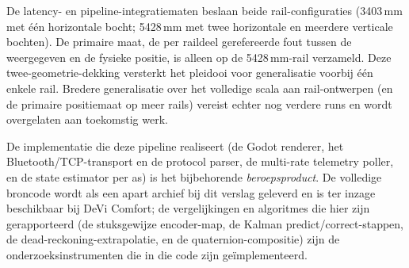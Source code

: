 \documentclass[10pt, a4paper, twocolumn]{article}
\begin{document}
De latency- en pipeline-integratiematen beslaan beide rail-configuraties
(3403\,mm met één horizontale bocht; 5428\,mm met twee horizontale en meerdere
verticale bochten). De primaire maat, de per raildeel gerefereerde fout tussen de weergegeven
en de fysieke positie, is alleen op de 5428\,mm-rail verzameld. Deze twee-geometrie-dekking versterkt het pleidooi
voor generalisatie voorbij één enkele rail. Bredere generalisatie over het
volledige scala aan rail-ontwerpen (en de primaire positiemaat op meer rails)
vereist echter nog verdere runs en wordt overgelaten aan toekomstig werk.

De implementatie die deze pipeline realiseert (de Godot renderer, het
Bluetooth/TCP-transport en de protocol parser, de multi-rate telemetry poller,
en de state estimator per as) is het bijbehorende \emph{beroepsproduct}. De
volledige broncode wordt als een apart archief bij dit verslag geleverd en is
ter inzage beschikbaar bij DeVi Comfort; de vergelijkingen en algoritmes die
hier zijn gerapporteerd (de stuksgewijze encoder-map, de Kalman
predict/correct-stappen, de dead-reckoning-extrapolatie, en de
quaternion-compositie) zijn de onderzoeksinstrumenten die in die code zijn
geïmplementeerd.
\end{document}
